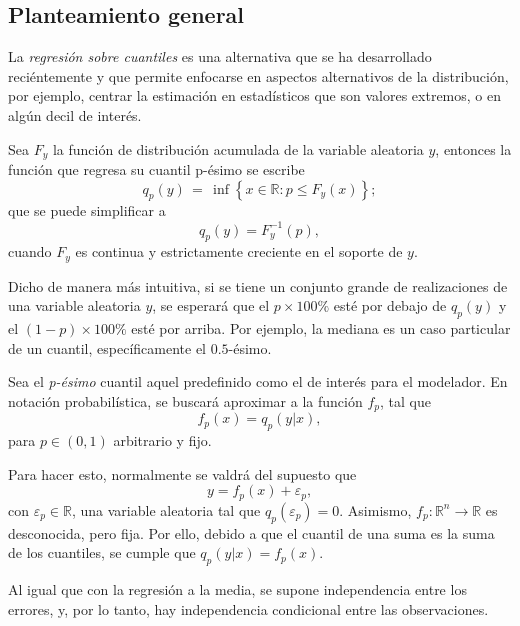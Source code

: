 \subsection{Planteamiento general}

La \textit{regresi\'on sobre cuantiles} es una alternativa que se ha desarrollado reci\'entemente y que permite enfocarse en aspectos alternativos de la distribuci\'on, por ejemplo, centrar la estimaci\'on en estad\'isticos que son valores extremos, o en alg\'un decil de inter\'es. 

\begin{defin}
Sea $F_y$ la funci\'on de distribuci\'on acumulada de la variable aleatoria $y$, entonces la funci\'on que regresa su cuantil p-\'esimo se escribe
\begin{equation*}
    q_p(y)\,=\,\inf \left\{x\in {\mathbb  {R}}:p\leq F_y(x)\right\};
\end{equation*}
que se puede simplificar a
\begin{equation*}
    q_p(y)=F_y^{-1}(p),
\end{equation*}
cuando $F_y$ es continua y estrictamente creciente en el soporte de $y$.
\end{defin}
Dicho de manera m\'as intuitiva, si se tiene un conjunto grande de realizaciones de una variable aleatoria $y$, se esperar\'a que el $p \times 100\%$ est\'e por debajo de $q_p(y)$ y el $(1-p) \times 100\%$ est\'e por arriba. Por ejemplo, la mediana es un caso particular de un cuantil, espec\'ificamente el $0.5$-\'esimo. 

Sea el \textit{p-\'esimo} cuantil aquel predefinido como el de inter\'es para el modelador. En notaci\'on probabil\'istica, se buscar\'a aproximar a la funci\'on $f_p$, tal que 
\begin{equation*}
    f_p(x) = q_p(y|x),
\end{equation*}
para $p \in (0,1)$ arbitrario y fijo.

Para hacer esto, normalmente se valdr\'a del supuesto que
\begin{equation*}
    y = f_p(x) + \varepsilon_p,
\end{equation*}
con $\varepsilon_p \in \mathbb{R}$, una variable aleatoria tal que $q_p(\varepsilon_p) = 0$. Asimismo, $f_p: \mathbb{R}^n \rightarrow \mathbb{R}$ es desconocida, pero fija. Por ello, debido a que el cuantil de una suma es la suma de los cuantiles, se cumple que $q_p(y|x) = f_p(x)$.

Al igual que con la regresi\'on a la media, se supone independencia entre los errores, y, por lo tanto, hay independencia condicional entre las observaciones.

